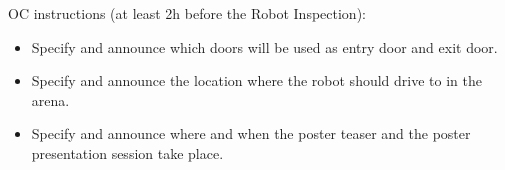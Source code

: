 \begin{enumerate}
	{\bf\item OC instructions (at least 2h before the Robot Inspection):}
	\begin{itemize}
		\item Specify and announce which doors will be used as entry door and exit door.
		\item Specify and announce the location where the robot should drive to in the arena.
		\item Specify and announce where and when the poster teaser and the poster presentation session take place.
	\end{itemize}
\end{enumerate}